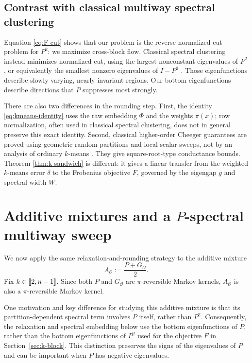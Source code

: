 \documentclass[11pt]{article}
\newcommand{\1}{\mathbf{1}}
\providecommand{\llbracket}{\mathopen{[\mkern-2.7mu[}}
\providecommand{\rrbracket}{\mathclose{]\mkern-2.7mu]}}
\begin{document}
\subsection{Contrast with classical multiway spectral clustering}

Equation \eqref{eq:F-cut} shows that our problem is the reverse
normalized-cut problem for $P^2$:
we maximize cross-block flow.  Classical spectral clustering instead
minimizes normalized cut, using the largest nonconstant eigenvalues of
$P^2$, or equivalently the smallest nonzero eigenvalues of $I-P^2$
\citep{ShiMalik2000,NgJordanWeiss2001}.  Those eigenfunctions describe
slowly varying, nearly invariant regions.  Our bottom eigenfunctions
describe directions that $P$ suppresses most strongly.

There are also two differences in the rounding step.  First, the
identity \eqref{eq:kmeans-identity} uses the raw embedding $\Phi$ and
the weights $\pi(x)$; row normalization, often used in classical
spectral clustering, does not in general preserve this exact identity.  Second,
classical higher-order Cheeger guarantees are proved using geometric
random partitions and local scalar sweeps, not by an analysis of
ordinary $k$-means \citep{LeeOveisGharanTrevisan2014}.  They give
square-root-type conductance bounds.  Theorem \ref{thm:k-sandwich} is
different: it gives a linear transfer from the weighted $k$-means
error $\delta$ to the Frobenius objective $F$, governed by the
eigengap $g$ and spectral width $W$.

\section{Additive mixtures and a \texorpdfstring{$P$}{P}-spectral
multiway sweep}
\label{sec:additive-mixture}

We now apply the same relaxation-and-rounding strategy to the additive
mixture
\[
A_{\mathcal O}:=\frac{P+G_{\mathcal O}}{2}.
\]
Fix $k\in\llbracket 2,n-1\rrbracket$.  Since both $P$
and $G_{\mathcal O}$ are $\pi$-reversible Markov kernels,
$A_{\mathcal O}$ is also a $\pi$-reversible Markov kernel.

One motivation and key difference for studying this additive mixture is that its
partition-dependent spectral term involves $P$ itself, rather than
$P^2$.  Consequently, the relaxation and spectral embedding below
use the bottom eigenfunctions of $P$, rather than the bottom
eigenfunctions of $P^2$ used for the objective $F$ in
Section~\ref{sec:k-block}.  This distinction preserves the signs of
the eigenvalues of $P$ and can be important when $P$ has negative
eigenvalues.
\end{document}
